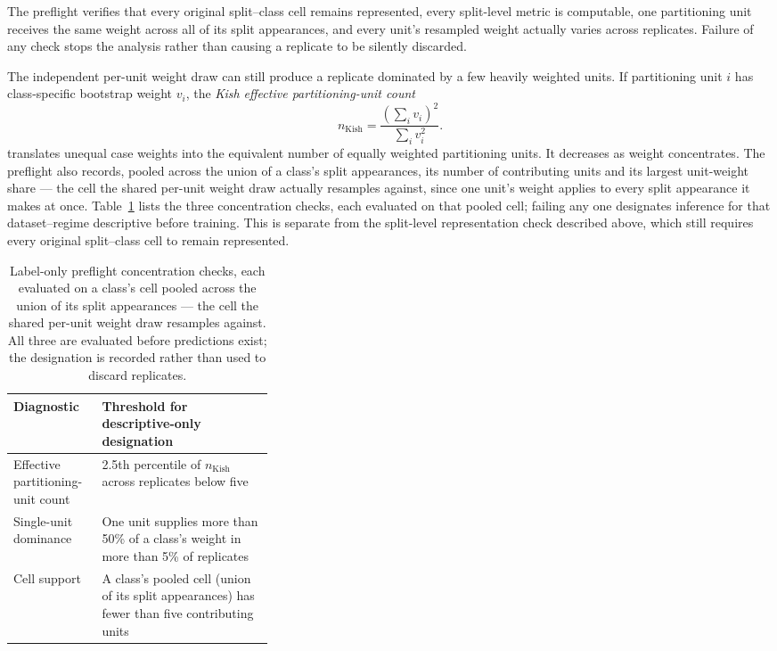 \documentclass[11pt]{article}
\begin{document}
\noindent The preflight verifies that every original split--class cell remains represented, every split-level metric is computable, one partitioning unit receives the same weight across all of its split appearances, and every unit's resampled weight actually varies across replicates. Failure of any check stops the analysis rather than causing a replicate to be silently discarded.

The independent per-unit weight draw can still produce a replicate dominated by a few heavily weighted units. If partitioning unit $i$ has class-specific bootstrap weight $v_i$, the \emph{Kish effective partitioning-unit count}
\begin{equation}
  n_{\mathrm{Kish}}=\frac{\left(\sum_i v_i\right)^2}{\sum_i v_i^2}.
  \label{eq:kish}
\end{equation}
\noindent translates unequal case weights into the equivalent number of equally weighted partitioning units. It decreases as weight concentrates. The preflight also records, pooled across the union of a class's split appearances, its number of contributing units and its largest unit-weight share --- the cell the shared per-unit weight draw actually resamples against, since one unit's weight applies to every split appearance it makes at once. Table~\ref{tab:preflight} lists the three concentration checks, each evaluated on that pooled cell; failing any one designates inference for that dataset--regime descriptive before training. This is separate from the split-level representation check described above, which still requires every original split--class cell to remain represented.

\begin{table}[ht]
  \centering
  \footnotesize
  \begin{tabularx}{\linewidth}{@{}>{\raggedright\arraybackslash}p{0.34\linewidth}X@{}}
    \toprule
    Diagnostic & Threshold for descriptive-only designation \\
    \midrule
    Effective partitioning-unit count & 2.5th percentile of $n_{\mathrm{Kish}}$ across replicates below five \\
    Single-unit dominance & One unit supplies more than 50\% of a class's weight in more than 5\% of replicates \\
    Cell support & A class's pooled cell (union of its split appearances) has fewer than five contributing units \\
    \bottomrule
  \end{tabularx}
  \caption{Label-only preflight concentration checks, each evaluated on a class's cell pooled across the union of its split appearances --- the cell the shared per-unit weight draw resamples against. All three are evaluated before predictions exist; the designation is recorded rather than used to discard replicates.}
  \label{tab:preflight}
\end{table}
\end{document}

